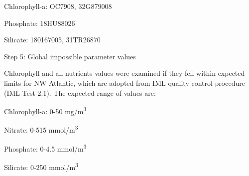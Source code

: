 \documentclass[letterpaper,portrait,12pt]{scrartcl}
\numberwithin{equation}{section}		%
\numberwithin{figure}{section}			%
\numberwithin{table}{section}				%
\begin{document}
\begin{flushleft}

	Chlorophyll-a: OC7908, 32G879008

\end{flushleft}


\begin{flushleft}

	Phosphate: 18HU88026

\end{flushleft}


\begin{flushleft}

	Silicate: 180167005, 31TR26870

\end{flushleft}








Step 5: Global impossible parameter values 




Chlorophyll and all nutrients values were examined if they fell within expected limits for NW Atlantic, which are adopted from IML quality control procedure (IML Test 2.1). The expected range of values are:








\begin{flushleft}

	Chlorophyll-a: 0-50 mg/m\textsuperscript{3}

\end{flushleft}


\begin{flushleft}

	Nitrate: 0-515 mmol/m\textsuperscript{3}

\end{flushleft}


\begin{flushleft}

	Phosphate: 0-4.5 mmol/m\textsuperscript{3}

\end{flushleft}


\begin{flushleft}

	Silicate: 0-250 mmol/m\textsuperscript{3}

\end{flushleft}
\end{document}
